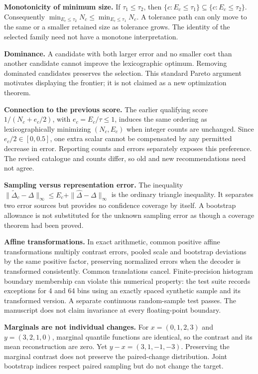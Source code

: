 \documentclass[10pt]{article}
\begin{document}
\textbf{Monotonicity of minimum size.} If $\tau_1\leq\tau_2$, then $\{c:E_c\leq\tau_1\}\subseteq\{c:E_c\leq\tau_2\}$. Consequently $\min_{E_c\leq\tau_2}N_c\leq\min_{E_c\leq\tau_1}N_c$. A tolerance path can only move to the same or a smaller retained size as tolerance grows. The identity of the selected family need not have a monotone interpretation.

\textbf{Dominance.} A candidate with both larger error and no smaller cost than another candidate cannot improve the lexicographic optimum. Removing dominated candidates preserves the selection. This standard Pareto argument motivates displaying the frontier; it is not claimed as a new optimization theorem.

\textbf{Connection to the previous score.} The earlier qualifying score $1/(N_c+e_c/2)$, with $e_c=E_c/\tau\leq1$, induces the same ordering as lexicographically minimizing $(N_c,E_c)$ when integer counts are unchanged. Since $e_c/2\in[0,0.5]$, one extra scalar cannot be compensated by any permitted decrease in error. Reporting counts and errors separately exposes this preference. The revised catalogue and counts differ, so old and new recommendations need not agree.

\textbf{Sampling versus representation error.} The inequality $\|\widetilde\Delta_c-\Delta\|_\infty\leq E_c+\|\widehat\Delta-\Delta\|_\infty$ is the ordinary triangle inequality. It separates two error sources but provides no confidence coverage by itself. A bootstrap allowance is not substituted for the unknown sampling error as though a coverage theorem had been proved.

\textbf{Affine transformations.} In exact arithmetic, common positive affine transformations multiply contrast errors, pooled scale and bootstrap deviations by the same positive factor, preserving normalized errors when the decoder is transformed consistently. Common translations cancel. Finite-precision histogram boundary membership can violate this numerical property: the test suite records exceptions for 4 and 64 bins using an exactly spaced synthetic sample and its transformed version. A separate continuous random-sample test passes. The manuscript does not claim invariance at every floating-point boundary.

\textbf{Marginals are not individual changes.} For $x=(0,1,2,3)$ and $y=(3,2,1,0)$, marginal quantile functions are identical, so the contrast and its mean reconstruction are zero. Yet $y-x=(3,1,-1,-3)$. Preserving the marginal contrast does not preserve the paired-change distribution. Joint bootstrap indices respect paired sampling but do not change the target.
\end{document}
